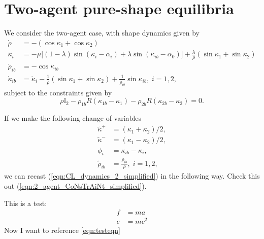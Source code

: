 \section{Two-agent pure-shape equilibria}

We consider the two-agent case, with shape dynamics given by
\begin{equation}
\begin{aligned}
\label{eqn:CL_dynamics_2_simplified}
\dot{\rho} &= - (\cos\kappa_1 + \cos\kappa_2) \\
\dot{\kappa}_i &= - \mu \Big[(1 - \lambda)\sin(\kappa_i - \alpha_i) + \lambda \sin(\kappa_{ib} - \alpha_0) \Big] + \frac{\lambda}{\rho}(\sin\kappa_1 + \sin\kappa_2) \\
\dot{\rho}_{ib} &= - \cos\kappa_{ib}  \\
\dot{\kappa}_{ib} &= \dot{\kappa}_i - \frac{1}{\rho}(\sin\kappa_1 + \sin\kappa_2) + \frac{1}{\rho_{ib}} \sin\kappa_{ib},  \; i=1,2,
\end{aligned}
\end{equation}
subject to the constraints given by
\begin{equation}
\rho \mathbb{I}_2 - \rho_{1b} R(\kappa_{1b} - \kappa_1) - \rho_{2b} R(\kappa_{2b} - \kappa_{2}) = 0. 
\label{eqn:2_agent_CoNsTrAiNt_simplified}
\end{equation}

If we make the following change of variables
\begin{align*}
\tilde{\kappa}^+ 
&= (\kappa_1 + \kappa_2)/2,
\nonumber \\
\tilde{\kappa}^- 
&= 
(\kappa_1 - \kappa_2)/2,
\nonumber \\
\phi_{i} 
&= 
\kappa_{ib} - \kappa_i,
\nonumber \\
\tilde{\rho}_{ib} 
&= 
\frac{\rho_{ib} }{\rho}, 
\; i=1,2,
\end{align*}
we can recast (\ref{eqn:CL_dynamics_2_simplified}) in the following way. Check this out (\ref{eqn:2_agent_CoNsTrAiNt_simplified}).

This is a test:
\begin{align}
\label{eqn:testeqn}
f &= m a \nonumber \\
e & =m c^2
\end{align}
Now I want to reference \ref{eqn:testeqn}
  
  
  
  
  
  
  
  
  
  
  
  
  
  
  
  
  
  
  
  
  
  
  
  